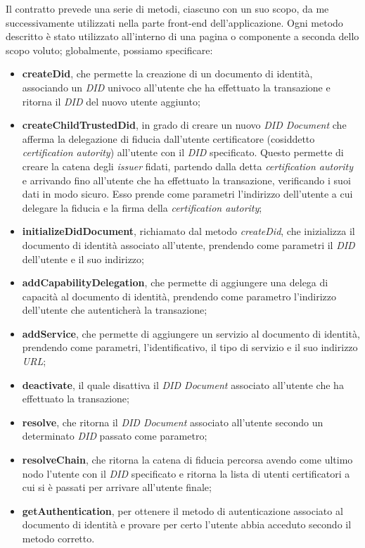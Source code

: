 Il contratto prevede una serie di metodi, ciascuno con un suo scopo, da me successivamente utilizzati nella parte front-end dell'applicazione.
Ogni metodo descritto è stato utilizzato all'interno di una pagina o componente a seconda dello scopo voluto; globalmente, possiamo specificare:
\begin{itemize}
    \item \textbf{createDid}, che permette la creazione di un documento di identità, associando un \textit{DID} univoco all'utente che ha effettuato la transazione e ritorna il \textit{DID} del nuovo utente aggiunto;
    \item \textbf{createChildTrustedDid}, in grado di creare un nuovo \textit{DID Document} che afferma la delegazione di fiducia dall'utente certificatore (cosiddetto \textit{certification autority}) all'utente con il \textit{DID} specificato.
    Questo permette di creare la catena degli \textit{issuer} fidati, partendo dalla detta \textit{certification autority} e arrivando fino all'utente che ha effettuato la transazione, verificando i suoi dati in modo sicuro.
    Esso prende come parametri l'indirizzo dell'utente a cui delegare la fiducia e la firma della \textit{certification autority};
    \item \textbf{initializeDidDocument}, richiamato dal metodo \textit{createDid}, che inizializza il documento di identità associato all'utente, prendendo come parametri il \textit{DID} dell'utente e il suo indirizzo;
    \item \textbf{addCapabilityDelegation}, che permette di aggiungere una delega di capacità al documento di identità, prendendo come parametro l'indirizzo dell'utente che autenticherà la transazione;
    \item \textbf{addService}, che permette di aggiungere un servizio al documento di identità, prendendo come parametri, l'identificativo, il tipo di servizio e il suo indirizzo \textit{URL};
    \item \textbf{deactivate}, il quale disattiva il \textit{DID Document} associato all'utente che ha effettuato la transazione;
    \item \textbf{resolve}, che ritorna il \textit{DID Document} associato all'utente secondo un determinato \textit{DID} passato come parametro;
    \item \textbf{resolveChain}, che ritorna la catena di fiducia percorsa avendo come ultimo nodo l'utente con il \textit{DID} specificato e ritorna la lista di utenti certificatori a cui si è passati per arrivare all'utente finale;
    \item \textbf{getAuthentication}, per ottenere il metodo di autenticazione associato al documento di identità e provare per certo l'utente abbia acceduto secondo il metodo corretto.
\end{itemize}

